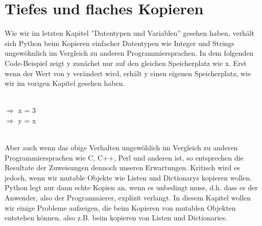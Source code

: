 \section{Tiefes und flaches Kopieren}
Wie wir im letzten Kapitel ''Datentypen und Variablen'' gesehen haben, verhält sich Python beim Kopieren einfacher Datentypen wie Integer und Strings ungewöhnlich im Vergleich zu anderen Programmiersprachen.
In dem folgenden Code-Beispiel zeigt y zunächst nur auf den gleichen Speicherplatz wie x. Erst wenn der Wert von y verändert wird, erhält y einen eigenen Speicherplatz, wie wir im vorigen Kapitel gesehen haben. \\
\\
\begin{MyConsoleBox}{
${\Longrightarrow}$ x = 3 \\
${\Longrightarrow}$ y = x \\
}\end{MyConsoleBox}
\\
Aber auch wenn das obige Verhalten ungewöhlich im Vergleich zu anderen Programmiersprachen wie C, C++, Perl und anderen ist, so entsprechen die Resultate der Zuweisungen dennoch unseren Erwartungen. Kritisch wird es jedoch, wenn wir mutable Objekte wie Listen und Dictionarys kopieren wollen. Python legt nur dann echte Kopien an, wenn es unbedingt muss, d.h. dass es der Anwender, also der Programmierer, explizit verlangt. In diesem Kapitel wollen wir einige Probleme aufzeigen, die beim Kopieren von mutablen Objekten entstehen können, also z.B. beim kopieren von Listen und Dictionaries. \\
\\
